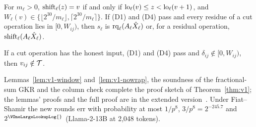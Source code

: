 \begin{lemma}[windows]
\label{lem:v1-window}
For $m_\ell>0$, $\mathrm{shift}_\ell(z)=v$ if and only if $\mathrm{lo}_\ell(v)\le z<\mathrm{lo}_\ell(v+1)$, and
$W_\ell(v)\in\{\lfloor2^{30}/m_\ell\rfloor,\lceil2^{30}/m_\ell\rceil\}$. If (D1) and (D4) pass and
every residue of a cut operation lies in $[0,W_{ij})$, then $s_\ell$ is
$\mathrm{rq}_\ell(A_\ell\hat X_\ell)$ or, for a residual operation, $\mathrm{shift}_\ell(A_\ell\hat X_\ell)$.
\end{lemma}

\begin{lemma}
\label{lem:v1-nowrap}
If a cut operation has the honest input, (D1) and (D4) pass and $\delta_{ij}\notin[0,W_{ij})$, then
$v_{ij}\notin\mathcal{T}$.
\end{lemma}

Lemmas~\ref{lem:v1-window} and~\ref{lem:v1-nowrap}, the soundness of the fractional-sum GKR and the
column check complete the proof sketch of Theorem~\ref{thm:v1}; the lemmas' proofs and the full
proof are in the extended version~\cite{fullversion}. Under Fiat--Shamir the new rounds err with probability at
most $1/p^8$, $3/p^8=2^{-245.7}$ and $2^{\VOneLargeLookupLog{}}$ (Llama-2-13B at 2{,}048 tokens).
